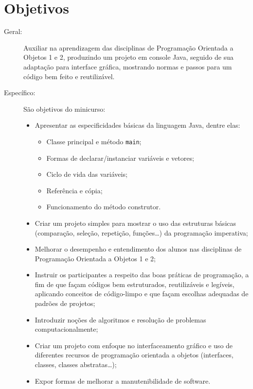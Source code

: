 \documentclass{article}
\begin{document}
\section{Objetivos}
\begin{description}
    \item[Geral:] Auxiliar na aprendizagem das disciplinas de
        Programação Orientada a Objetos 1 e 2, produzindo um projeto em
        console Java, seguido de sua adaptação para interface gráfica,
        mostrando normas e passos para um código bem feito e
        reutilizável.
    \item[Específico:] São objetivos do minicurso:
        \begin{itemize}[label={-}]
            \item Apresentar as especificidades básicas da linguagem
                Java, dentre elas:
                \begin{itemize}[label={-}]
                    \item Classe principal e método \texttt{main};
                    \item Formas de declarar/instanciar variáveis e
                        vetores;
                    \item Ciclo de vida das variáveis;
                    \item Referência e cópia;
                    \item Funcionamento do método construtor.
                \end{itemize}
            \item Criar um projeto simples para mostrar o uso das
                estruturas básicas (comparação, seleção, repetição,
                funções\ldots) da programação imperativa;
            \item Melhorar o desempenho e entendimento dos alunos nas
                disciplinas de Programação Orientada a Objetos 1 e 2;
            \item Instruir os participantes a respeito das boas
                práticas de programação, a fim de que façam códigos bem
                estruturados, reutilizáveis e legíveis, aplicando
                conceitos de código-limpo e que façam escolhas
                adequadas de padrões de projetos;
            \item Introduzir noções de algoritmos e resolução de
                problemas computacionalmente;
            \item Criar um projeto com enfoque no interfaceamento
                gráfico e uso de diferentes recursos de programação
                orientada a objetos (interfaces, classes, classes
                abstratas\ldots);
            \item Expor formas de melhorar a manutenibilidade de
                software.
        \end{itemize}
\end{description}
\end{document}
